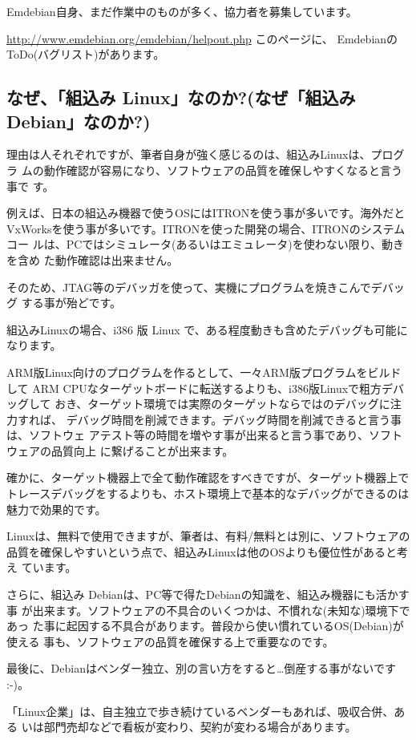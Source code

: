 \documentclass[mingoth,a4paper]{jsarticle}
\begin{document}
Emdebian自身、まだ作業中のものが多く、協力者を募集しています。

\url{http://www.emdebian.org/emdebian/helpout.php} このページに、
EmdebianのToDo(バグリスト)があります。

\subsection{なぜ、「組込み Linux」なのか?(なぜ「組込み Debian」なのか?)}

理由は人それぞれですが、筆者自身が強く感じるのは、組込みLinuxは、プログラ
ムの動作確認が容易になり、ソフトウェアの品質を確保しやすくなると言う事で
す。

例えば、日本の組込み機器で使うOSにはITRONを使う事が多いです。海外だと
VxWorksを使う事が多いです。ITRONを使った開発の場合、ITRONのシステムコー
ルは、PCではシミュレータ(あるいはエミュレータ)を使わない限り、動きを含め
た動作確認は出来ません。

そのため、JTAG等のデバッガを使って、実機にプログラムを焼きこんでデバッグ
する事が殆どです。

組込みLinuxの場合、i386 版 Linux で、ある程度動きも含めたデバッグも可能に
なります。

ARM版Linux向けのプログラムを作るとして、一々ARM版プログラムをビルドして
ARM CPUなターゲットボードに転送するよりも、i386版Linuxで粗方デバッグして
おき、ターゲット環境では実際のターゲットならではのデバッグに注力すれば、
デバッグ時間を削減できます。デバッグ時間を削減できると言う事は、ソフトウェ
アテスト等の時間を増やす事が出来ると言う事であり、ソフトウェアの品質向上
に繋げることが出来ます。

確かに、ターゲット機器上で全て動作確認をすべきですが、ターゲット機器上で
トレースデバッグをするよりも、ホスト環境上で基本的なデバッグができるのは
魅力で効果的です。

Linuxは、無料で使用できますが、筆者は、有料/無料とは別に、ソフトウェアの
品質を確保しやすいという点で、組込みLinuxは他のOSよりも優位性があると考え
ています。

さらに、組込み Debianは、PC等で得たDebianの知識を、組込み機器にも活かす事
が出来ます。ソフトウェアの不具合のいくつかは、不慣れな(未知な)環境下であっ
た事に起因する不具合があります。普段から使い慣れているOS(Debian)が使える
事も、ソフトウェアの品質を確保する上で重要なのです。

最後に、Debianはベンダー独立、別の言い方をすると…倒産する事がないです :-)。

「Linux企業」は、自主独立で歩き続けているベンダーもあれば、吸収合併、ある
いは部門売却などで看板が変わり、契約が変わる場合があります。
\end{document}
